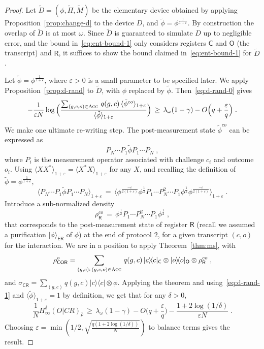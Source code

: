 \documentclass[11pt]{article}
\theoremstyle{remark}
\theoremstyle{definition}
\newcommand{\ket}[1]{|#1\rangle}
\newcommand{\bra}[1]{\langle#1|}
\newcommand{\proj}[1]{\ket{#1}\!\bra{#1}}
\newcommand{\reg}[1]{{\textsf{#1}}}
\newcommand{\ol}[1]{\overline{#1}}
\newcommand{\eps}{\varepsilon}
\newcommand{\Acc}{\textsc{Acc}}
\newcommand{\Hmin}{H_\infty}
\begin{document}
\begin{proof}
Let $\tilde{D} = (\phi,\tilde{\Pi},\tilde{M})$ be the elementary device obtained by applying Proposition~\ref{prop:change-d} to the device $D$, and $\tilde{\phi}= \phi^{\frac{1}{1+\eps}}$. By construction the overlap of $\tilde{D}$ is at most $\omega$. Since $\tilde{D}$ is guaranteed to simulate $D$ up to negligible error, and the bound in~\eqref{eq:ent-bound-1} only considers registers $\reg{C}$ and $\reg{O}$ (the transcript) and $\reg{R}$, it suffices to show the bound claimed in~\eqref{eq:ent-bound-1} for $\tilde{D}$. 

Let $\tilde{\phi}= \phi^{\frac{1}{1+\eps}}$, where $\eps>0$ is a small parameter to be specified later. We apply Proposition~\ref{prop:d-rand} to $\tilde{D}$, with $\phi$ replaced by $\tilde{\phi}$. Then~\eqref{eq:d-rand-0} gives
\begin{equation}\label{eq:d-rand-1}
- \frac{1}{\eps N} \log \Big( \frac{ \sum_{(g,c,o) \in \Acc} \,q(g,c)\, \langle \tilde{\phi}^{co} \rangle_{1+\eps}}{\langle \tilde{\phi} \rangle_{1+\eps} }\Big) \,\geq\,  \lambda_\omega(1-\gamma) - O\Big(q+\frac{\eps}{q}\Big)\;.
\end{equation}
We make one ultimate re-writing step. The post-measurement state $\tilde{\phi}^{co}$ can be expressed as 
$$P_N\cdots P_1\tilde{\phi} P_1 \cdots P_N\;,$$
 where $P_i$ is the measurement operator associated with challenge $c_i$ and outcome $o_i$. Using $\langle XX^*\rangle_{1+\eps} = \langle X^* X \rangle_{1+\eps}$ for any $X$, and recalling the definition of $\tilde{\phi} = \phi^{\frac{1}{1+\eps}}$, 
$$\langle P_N\cdots P_1\tilde{\phi} P_1 \cdots P_N \rangle_{1+\eps} \,=\, \langle \phi^{\frac{-\eps}{2(1+\eps)}} \phi^{\frac{1}{2}}P_1\cdots P_N^2 \cdots P_1\phi^{\frac{1}{2}}\phi^{\frac{-\eps}{2(1+\eps)}} \rangle_{1+\eps}\;.$$
Introduce a sub-normalized density 
$$\rho_\reg{R}^{co}\,=\, \phi^{\frac{1}{2}}P_1\cdots P_N^2 \cdots P_1\phi^{\frac{1}{2}}\;,$$
that corresponds to the post-measurement state of register $\reg{R}$ (recall we assumed a purification $\ket{\phi}_{\reg{ER}}$ of $\phi$) at the end of protocol $2$, for a given transcript $(c,o)$ for the interaction. We are in a position to apply Theorem~\ref{thm:ms}, with 
$$\rho_{\reg{COR}}^o = \sum_{(g,c):\,(g,c,o)\in \Acc} \,q(g,c)\, \proj{c}_\reg{C} \otimes \proj{o}_\reg{O}\otimes \rho_\reg{R}^{co}\;,$$
and $\sigma_\reg{CR} = \sum_{(g,c)} q(g,c)\proj{c} \otimes \phi$. Applying the theorem and using~\eqref{eq:d-rand-1} and $\langle\tilde{\phi}\rangle_{1+\eps} = 1$ by definition, we get that for any $\delta >0$,
$$\frac{1}{N} \Hmin^\delta(O|CR)_{\ol{\rho}} \,\geq \,  \lambda_\omega(1-\gamma) - O\Big(q+\frac{\eps}{q}\Big) - \frac{1+2\log(1/\delta)}{\eps N}\;.$$
Choosing $\eps = \min(1/2,\sqrt{\frac{q(1+2\log(1/\delta))}{N}})$ to balance terms gives the result. 
\end{proof}
\end{document}

